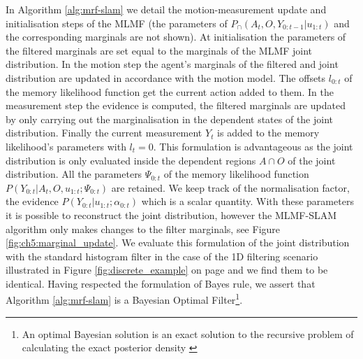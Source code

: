 \begin{appendices}
In Algorithm \ref{alg:mrf-slam} we detail the motion-measurement update  and initialisation steps of the MLMF
(the parameters of $P_{\cap}(A_t,O,Y_{0:t-1}|u_{1:t})$ and the corresponding marginals are not shown).
At initialisation the parameters of the filtered marginals are set equal to the marginals of the MLMF joint distribution.
In the motion step the agent's marginals of the filtered and joint distribution are updated in 
accordance with the motion model. The offsets $l_{0:t}$ of the memory likelihood function get the current action added 
to them. In the measurement step the evidence is computed, the filtered marginals are updated by only carrying out 
the marginalisation in the dependent states of the joint distribution. Finally the current measurement $Y_t$ is added
to the memory likelihood's parameters with $l_t=0$.
This formulation is advantageous as the joint distribution is only evaluated inside the dependent regions 
$A\cap O$ of the joint distribution. All the parameters $\Psi_{0:t}$ of the memory likelihood function
$P(Y_{0:t}|A_t,O,u_{1:t};\Psi_{0:t})$ are retained. We keep track of the normalisation factor, the evidence 
$P(Y_{0:t}|u_{1:t};\alpha_{0:t})$ which is a scalar quantity. 
With these parameters it is possible to reconstruct the joint distribution, however the MLMF-SLAM algorithm only
makes changes to the filter marginals, see Figure \ref{fig:ch5:marginal_update}. 
We evaluate this formulation of the joint distribution with the standard histogram filter in the case of the 1D filtering scenario
illustrated in Figure \ref{fig:discrete_example} on page \pageref{fig:discrete_example} and we find them to be identical. Having respected the formulation of Bayes rule, we
assert that Algorithm \ref{alg:mrf-slam} is a Bayesian Optimal Filter\footnote{An optimal Bayesian solution is an exact solution to the recursive problem of calculating the exact posterior density 
\cite{PF_tutorial_2002}}.


\end{appendices}
